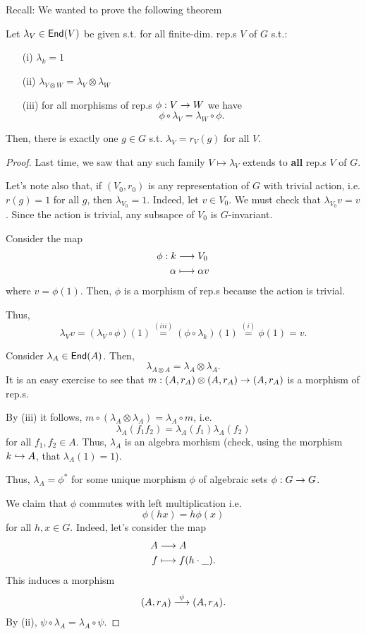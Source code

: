 Recall: We wanted to prove the following theorem
\begin{theorem}
	Let $\lambda_V \in  \textsf{End}(V)$ be given s.t. for all finite-dim. rep.s $V$ of $G$ s.t.:
	\begin{itemize}
		\item[(i)] $\lambda_k = 1$
		\item[(ii)] $\lambda_{V\otimes W} = \lambda_V \otimes \lambda_W$
		\item[(iii)] for all morphisms of rep.s $\phi :V \overset{}{\rightarrow} W$ we have
		\[ \phi \circ \lambda_V = \lambda_W \circ \phi. \]
	\end{itemize}
Then, there is exactly one $g \in G$ s.t. $\lambda_V = r_V(g)$ for all $V$.
\end{theorem}
\begin{proof}
	Last time, we saw that any such family $V \mapsto \lambda_V$ extends to \textbf{all} rep.s $V$ of $G$.
	
	Let's note also that, if $(V_0, r_0)$ is any representation of $G$ with trivial action, i.e. $r(g) = 1$ for all $g$, then $\lambda_{V_0} = 1$.
	Indeed, let $v\in V_0$. We must check that $\lambda_{V_0} v = v$. Since the action is trivial, any subsapce of $V_0$ is $G$-invariant.
	
	Consider the map
	\begin{align*}
	\phi : k& \overset{}{\longrightarrow} V_0\\
	\alpha & \longmapsto \alpha v
	\end{align*}
	where $v = \phi(1)$. Then, $\phi$ is a morphism of rep.s because the action is trivial.
	
	Thus,
	\[ \lambda_Vv = (\lambda_V \circ \phi)(1) \overset{(iii)}{=} (\phi \circ \lambda_k) (1) \overset{(i)}{=} \phi(1) = v. \]
	
	Consider $\lambda_A \in \textsf{End}(A)$. Then,
	\[ \lambda_{A\otimes A} = \lambda_A \otimes \lambda_A. \]
	It is an easy exercise to see that $m : (A, r_A) \otimes (A,r_A) \overset{}{\rightarrow} (A,r_A)$ is a morphism of rep.s.
	
	By (iii) it follows, $m \circ (\lambda_A\otimes \lambda_A) = \lambda_A \circ m$, i.e.
	\[ \lambda_A(f_1f_2) = \lambda_A(f_1) \lambda_A(f_2) \]
	for all $f_1, f_2 \in A$. Thus, $\lambda_A$ is an algebra morhism (check, using the morphism $k \overset{}{\hookrightarrow} A$, that $\lambda_A(1) = 1$).
	
	Thus, $\lambda_A = \phi^*$ for some unique morphism $\phi$ of algebraic sets $\phi : G \overset{}{\rightarrow} G$.
	
	We claim that $\phi$ commutes with left multiplication i.e.
	\[ \phi(hx) = h \phi(x) \]
	for all $h,x \in G$. Indeed, let's consider the map
	\begin{align*}
	A & \overset{}{\longrightarrow} A\\
	f &\longmapsto f(h\cdot\_).
	\end{align*}
	This induces a morphism
	\begin{align*}
	(A, r_A) \overset{\psi}{\longrightarrow} (A,r_A).
	\end{align*}
	By (ii), $\psi \circ \lambda_A = \lambda_A \circ \psi$.
	

\end{proof}

